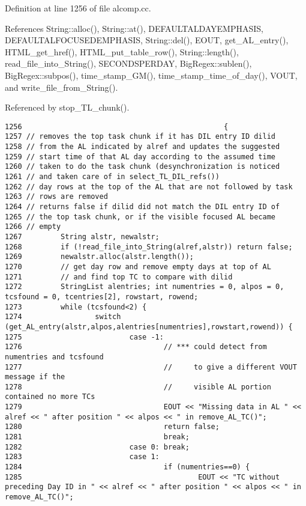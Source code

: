 Definition at line 1256 of file alcomp.cc.

References String::alloc(), String::at(), DEFAULTALDAYEMPHASIS, DEFAULTALFOCUSEDEMPHASIS, String::del(), EOUT, get\_\-AL\_\-entry(), HTML\_\-get\_\-href(), HTML\_\-put\_\-table\_\-row(), String::length(), read\_\-file\_\-into\_\-String(), SECONDSPERDAY, Big\-Regex::sublen(), Big\-Regex::subpos(), time\_\-stamp\_\-GM(), time\_\-stamp\_\-time\_\-of\_\-day(), VOUT, and write\_\-file\_\-from\_\-String().

Referenced by stop\_\-TL\_\-chunk().



\footnotesize\begin{verbatim}1256                                               {
1257 // removes the top task chunk if it has DIL entry ID dilid
1258 // from the AL indicated by alref and updates the suggested
1259 // start time of that AL day according to the assumed time
1260 // taken to do the task chunk (desynchronization is noticed
1261 // and taken care of in select_TL_DIL_refs())
1262 // day rows at the top of the AL that are not followed by task
1263 // rows are removed
1264 // returns false if dilid did not match the DIL entry ID of
1265 // the top task chunk, or if the visible focused AL became
1266 // empty
1267         String alstr, newalstr;
1268         if (!read_file_into_String(alref,alstr)) return false;
1269         newalstr.alloc(alstr.length());
1270         // get day row and remove empty days at top of AL
1271         // and find top TC to compare with dilid
1272         StringList alentries; int numentries = 0, alpos = 0, tcsfound = 0, tcentries[2], rowstart, rowend;
1273         while (tcsfound<2) {
1274                 switch (get_AL_entry(alstr,alpos,alentries[numentries],rowstart,rowend)) {
1275                         case -1:
1276                                 // *** could detect from numentries and tcsfound
1277                                 //     to give a different VOUT message if the
1278                                 //     visible AL portion contained no more TCs
1279                                 EOUT << "Missing data in AL " << alref << " after position " << alpos << " in remove_AL_TC()";
1280                                 return false;
1281                                 break;
1282                         case 0: break;
1283                         case 1:
1284                                 if (numentries==0) {
1285                                         EOUT << "TC without preceding Day ID in " << alref << " after position " << alpos << " in remove_AL_TC()";

\end{verbatim}
